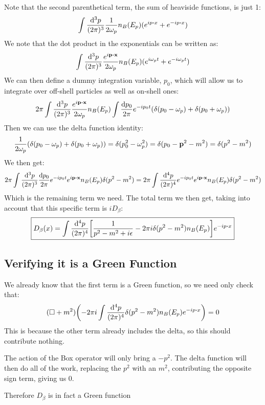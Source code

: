 \documentclass[12pt]{article}
\begin{document}
Note that the second parenthetical term, the sum of heaviside functions, is just 1:
\begin{align*}
    \int\frac{\dd[3]{p}}{(2\pi)^3}\frac1{2\omega_p}n_B(E_p)(e^{ip\vdot x}+e^{-ip\vdot x})
\end{align*}
We note that the dot product in the exponentials can be written as:
\begin{align*}
    \int\frac{\dd[3]{p}}{(2\pi)^3}\frac{e^{i\vb{p}\vdot\vb{x}}}{2\omega_p}n_B(E_p)(e^{i\omega_pt}+e^{-i\omega_p t})
\end{align*}
We can then define a dummy integration variable, $p_0$, which will allow us to integrate over off-shell particles as well as on-shell ones:
\begin{align*}
    2\pi\int\frac{\dd[3]{p}}{(2\pi)^3}\frac{e^{i\vb{p}\vdot\vb{x}}}{2\omega_p}n_B(E_p)
    \int\frac{\dd{p_0}}{2\pi}e^{-ip_0t}(\delta(p_0-\omega_p)+\delta(p_0+\omega_p))
\end{align*}
Then we can use the delta function identity:
\begin{align*}
    \frac1{2\omega_p}\qty(\delta(p_0-\omega_p)+\delta(p_0+\omega_p))=\delta(p_0^2-\omega_p^2)=\delta(p_0-\vb{p}^2-m^2)=\delta(p^2-m^2)
\end{align*}
We then get:
\begin{align*}
    2\pi\int\frac{\dd[3]{p}}{(2\pi)^3}\frac{\dd{p_0}}{2\pi}e^{-ip_0t}e^{i\vb{p}\vdot\vb{x}}n_B(E_p)
    \delta(p^2-m^2)
    =2\pi \int\frac{\dd[4]{p}}{(2\pi)^4}e^{-ip_0t}e^{i\vb{p}\vdot\vb{x}}n_B(E_p)\delta(p^2-m^2)
\end{align*}
Which is the remaining term we need. The total term we then get, taking into account that this specific term is $iD_\beta$:
\begin{align}
    \boxed{D_\beta(x)=\int\frac{\dd[4]{p}}{(2\pi)^4}\qty[\frac1{p^2-m^2+i\epsilon}-2\pi i\delta(p^2-m^2)n_B(E_p)]e^{-ip\vdot x}}
\end{align}
\subsection{Verifying it is a Green Function}
We already know that the first term is a Green function, so we need only check that:
\begin{align*}
    (\Box+m^2)\qty(-2\pi i\int\frac{\dd[4]{p}}{(2\pi)^4}\delta(p^2-m^2)n_B(E_p)e^{-ip\vdot x})=0
\end{align*}
This is because the other term already includes the delta, so this should contribute nothing. 

The action of the Box operator will only bring a $-p^2$. The delta function will then do all of the work, replacing the $p^2$ with an $m^2$, contributing the opposite sign term, giving us $0$.

Therefore $D_\beta$ is in fact a Green function
\end{document}
